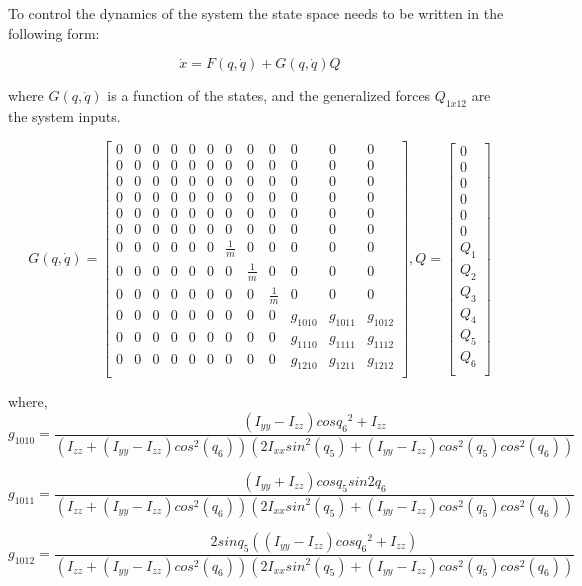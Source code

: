 \documentclass[10pt, letterpaper]{article}
\begin{document}
To control the dynamics of the system the state space needs to be written in the following form:

\[
\dot{x} = F(q,\dot{q}) + G(q,\dot{q}) Q
\]

where $G(q,\dot{q})$ is a function of the states, and the generalized forces $Q_{1x12}$ are the system inputs.

\[
G(q,\dot{q}) = \begin{bmatrix}
0&0&0&0&0&0&0&0&0&0&0&0\\
0&0&0&0&0&0&0&0&0&0&0&0\\
0&0&0&0&0&0&0&0&0&0&0&0\\
0&0&0&0&0&0&0&0&0&0&0&0\\
0&0&0&0&0&0&0&0&0&0&0&0\\
0&0&0&0&0&0&0&0&0&0&0&0\\
0&0&0&0&0&0&\frac{1}{m}&0&0&0&0&0\\
0&0&0&0&0&0&0&\frac{1}{m}&0&0&0&0\\
0&0&0&0&0&0&0&0&\frac{1}{m}&0&0&0\\
0&0&0&0&0&0&0&0&0&g_{1010}&g_{1011}&g_{1012}\\
0&0&0&0&0&0&0&0&0&g_{1110}&g_{1111}&g_{1112}\\
0&0&0&0&0&0&0&0&0&g_{1210}&g_{1211}&g_{1212}\\
\end{bmatrix},
Q = \left[\begin{array}{c}
0\\
0\\
0\\
0\\
0\\
0\\
Q_{1}\\
Q_{2}\\
Q_{3}\\
Q_{4}\\
Q_{5}\\
Q_{6}\\
\end{array}\right]
\]

where,
\[
g_{1010} = \frac{(I_{yy}-I_{zz})cos{q_{6}}^2 + I_{zz}}{(I_{zz} + (I_{yy} - I_{zz}) {cos}^{2}(q_{6})) (2 I_{xx} {sin}^{2}(q_{5}) + (I_{yy} - I_{zz}) {cos}^{2}(q_{5}) {cos}^{2}(q_{6}))}
\]

\[
g_{1011} = \frac{(I_{yy}+I_{zz})cos{q_{5}}sin{2q_{6}}}{(I_{zz} + (I_{yy} - I_{zz}) {cos}^{2}(q_{6})) (2 I_{xx} {sin}^{2}(q_{5}) + (I_{yy} - I_{zz}) {cos}^{2}(q_{5}) {cos}^{2}(q_{6}))}
\]

\[
g_{1012} = \frac{2sin{q_{5}}((I_{yy}-I_{zz})cos{q_{6}}^2 + I_{zz})}{(I_{zz} + (I_{yy} - I_{zz}) {cos}^{2}(q_{6})) (2 I_{xx} {sin}^{2}(q_{5}) + (I_{yy} - I_{zz}) {cos}^{2}(q_{5}) {cos}^{2}(q_{6}))}
\]
\end{document}
